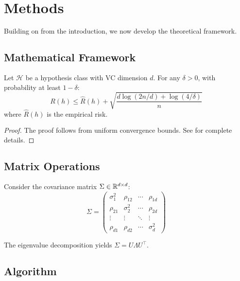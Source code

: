 
\section{Methods}
\label{sec:methods}

Building on  from the introduction, we now
develop the theoretical framework.

\subsection{Mathematical Framework}

\begin{theorem}
\label{thm:main}
Let $\mathcal{H}$ be a hypothesis class with VC dimension $d$.
For any $\delta > 0$, with probability at least $1 - \delta$:
\begin{equation}
\label{eq:pac-bound}
R(h) \leq \hat{R}(h) + \sqrt{\frac{d \log(2n/d) + \log(4/\delta)}{n}}
\end{equation}
where $\hat{R}(h)$ is the empirical risk.
\end{theorem}

\begin{proof}
The proof follows from uniform convergence bounds. See \cite{shalev2014}
for complete details.
\end{proof}

\subsection{Matrix Operations}

Consider the covariance matrix $\Sigma \in \mathbb{R}^{d \times d}$:
\begin{equation}
\Sigma = \begin{pmatrix}
\sigma_1^2 & \rho_{12} & \cdots & \rho_{1d} \\
\rho_{21} & \sigma_2^2 & \cdots & \rho_{2d} \\
\vdots & \vdots & \ddots & \vdots \\
\rho_{d1} & \rho_{d2} & \cdots & \sigma_d^2
\end{pmatrix}
\end{equation}

The eigenvalue decomposition yields $\Sigma = U \Lambda U^\top$.

\subsection{Algorithm}

